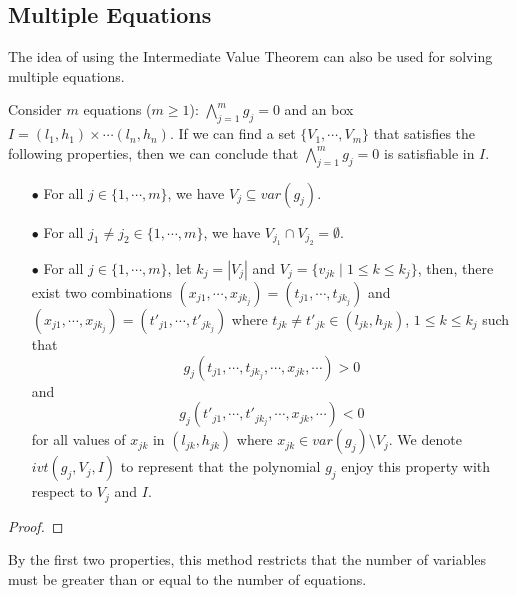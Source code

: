 \documentclass[runningheads,a4paper,oribibl]{llncs}
\begin{document}
\subsection*{Multiple Equations}
The idea of using the Intermediate Value Theorem can also be used for solving multiple equations. 
\begin{lemma}
Consider $m$ equations ($m \ge 1$): $\bigwedge \limits_{j=1}^m g_j = 0$ and an box $ I = {(l_1, h_1) \times \cdots (l_n, h_n)}$. If we can find a set ${\{V_1, \cdots, V_m\}}$ that satisfies the following properties, then we can conclude that $\bigwedge \limits_{j=1}^m g_j = 0$ is satisfiable in $I$.
\begin{itemize}
\item[$\bullet$] For all $j \in \{1, \cdots, m\}$, we have ${V_j \subseteq var(g_j)}$.
\item[$\bullet$] For all $j_1 \neq j_2\in \{1, \cdots, m\}$, we have $V_{j_1} \cap V_{j_2} = \emptyset$.
\item[$\bullet$] For all $j\in \{1, \cdots, m\}$, let $k_j = |V_j|$ and ${V_j = \{v_{jk} \; | \; 1 \le k \le k_j \}}$, then, there exist two combinations ${(x_{j1}, \cdots, x_{jk_j}) = (t_{j1}, \cdots, t_{jk_j})}$ and ${(x_{j1}, \cdots, x_{jk_j}) = (t'_{j1}, \cdots, t'_{jk_j})}$ where $t_{jk} \neq t'_{jk} \in (l_{jk}, h_{jk})$, $1 \le k \le k_j$ such that \[g_j(t_{j1}, \cdots, t_{jk_j}, \cdots, x_{jk}, \cdots) > 0\] and \[g_j(t'_{j1}, \cdots, t'_{jk_j}, \cdots, x_{jk}, \cdots) < 0\] for all values of $x_{jk}$ in $(l_{jk}, h_{jk})$ where $x_{jk} \in var(g_j) \setminus V_j$. We denote $ivt(g_j, V_j, I)$ to represent that the polynomial $g_j$ enjoy this property with respect to $V_j$ and $I$.
\end{itemize}
\end{lemma}
\begin{proof}

\end{proof}
By the first two properties, this method restricts that the number of variables must be greater than or equal to the number of equations.
\end{document}
